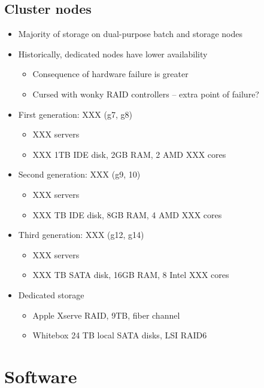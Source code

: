 \documentclass{beamer}
\begin{document}
\subsection{Cluster nodes}
\begin{frame}
\begin{itemize}
	\item Majority of storage on dual-purpose batch and storage nodes
	\item Historically, dedicated nodes have lower availability
	\begin{itemize}
		\item Consequence of hardware failure is greater
		\item Cursed with wonky RAID controllers -- extra point of failure?
	\end{itemize}
	\item First generation: XXX (g7, g8)
	\begin{itemize}
		\item XXX servers
		\item XXX 1TB IDE disk, 2GB RAM, 2 AMD XXX cores 
	\end{itemize}
	\item Second generation: XXX (g9, 10)
	\begin{itemize}
		\item XXX servers
		\item XXX TB IDE disk, 8GB RAM, 4 AMD XXX cores
	\end{itemize}
	\item Third generation: XXX (g12, g14)
	\begin{itemize}
		\item XXX servers
		\item XXX TB SATA disk, 16GB RAM, 8 Intel XXX cores
	\end{itemize}
	\item Dedicated storage
	\begin{itemize}
		\item Apple Xserve RAID, 9TB, fiber channel
		\item Whitebox 24 TB local SATA disks, LSI RAID6
	\end{itemize}
\end{itemize}
\end{frame}

\section{Software}
\end{document}
